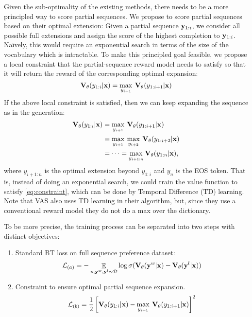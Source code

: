 Given the sub-optimality of the existing methods, there needs to be a more principled way to score partial sequences. 
We propose to score partial sequences based on their optimal extension: 
Given a partial sequence ${\mathbf{y}}_{1:i}$, we consider all possible full extensions and assign the score of the highest completion to ${\mathbf{y}}_{1:i}$. 
Na\"{i}vely, this would require an exponential search in terms of the size of the vocabulary which is intractable. To make this principled goal feasible, we propose a local constraint that the partial-sequence reward model needs to satisfy so that it will return the reward of the corresponding optimal expansion: 
\begin{equation} \label{eq:constraint}
    \mathbf{V}_{\theta}(y_{1:i}|{\mathbf{x}}) = \max_{y_{i+1}} \: \mathbf{V}_{\theta}(y_{1:i+1}|{\mathbf{x}})
\end{equation}
If the above local constraint is satisfied, then we can keep expanding the sequence as in the generation:
$$
\begin{aligned}
\mathbf{V}_{\theta}(y_{1:i}|{\mathbf{x}}) &= \max_{y_{i+1}} \: \mathbf{V}_{\theta}(y_{1:i+1}|{\mathbf{x}}) \\
&= \max_{y_{i+1}} \: \max_{y_{i+2}}\: \mathbf{V}_{\theta}(y_{1:i+2}|{\mathbf{x}}) \\
&= \cdots = \max_{y_{i+1:n}}\mathbf{V}_{\theta}(y_{1:n}|{\mathbf{x}}),
\end{aligned}
$$
where $y_{i+1:n}$ is the optimal extension beyond $y_{1:i}$ and $y_n$ is the EOS token. That is, instead of doing an exponential search, we could train the value function to satisfy \eqref{eq:constraint}, which can be done by Temporal Difference (TD) learning. Note that VAS also uses TD learning in their algorithm, but, since they use a conventional reward model they do not do a max over the dictionary.

To be more precise, the training process can be separated into two steps with distinct objectives:
\begin{enumerate}
    \item Standard BT loss on full sequence preference dataset:
        \begin{equation} \label{eq:bradley-terry-new}
        \mathcal{L}_{(a)} = - \mathop{\mathbb{E}}_{{\mathbf{x}}, {\mathbf{y}}^w, {\mathbf{y}}^l \sim \mathcal{D}} \log \sigma ( \mathbf{V}_{\theta} ({\mathbf{y}}^w|{\mathbf{x}}) - \mathbf{V}_{\theta} ({\mathbf{y}}^l|{\mathbf{x}}))
        \end{equation}
    \item Constraint to ensure optimal partial sequence expansion.
        \begin{equation} \label{eq:constraint_loss}
            \mathcal{L}_{(b)} = \frac{1}{2}\left[\mathbf{V}_{\theta}(y_{1:i}|{\mathbf{x}}) - \max_{y_{i+1}} \:\mathbf{V}_{\theta}(y_{1:i+1}|{\mathbf{x}})\right]^2       
        \end{equation}
\end{enumerate}

